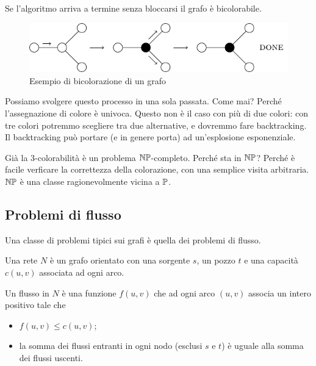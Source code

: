 Se l'algoritmo arriva a termine senza bloccarsi il grafo è bicolorabile.

\begin{figure}[h]
    \begin{center}
        \includegraphics{./img/complexity_intro/2Coloration.pdf}
    \end{center}
    \caption{Esempio di bicolorazione di un grafo}
\end{figure}

Possiamo svolgere questo processo in una sola passata. Come mai? Perché l'assegnazione di colore è
univoca. Questo non è il caso con più di due colori: con tre colori potremmo scegliere tra due
alternative, e dovremmo fare backtracking. Il backtracking può portare (e in genere porta) ad
un'esplosione esponenziale.

Già la 3-colorabilità è un problema $\mathbb{NP}$-completo. Perché sta in $\mathbb{NP}$? Perché è
facile verficare la correttezza della colorazione, con una semplice visita arbitraria. $\mathbb{NP}$ è
una classe ragionevolmente vicina a $\mathbb{P}$.

\subsection{Problemi di flusso}

Una classe di problemi tipici sui grafi è quella dei problemi di flusso.

\begin{defn}
    Una rete $N$ è un grafo orientato con una sorgente $s$, un pozzo $t$ e una capacità $c(u,v)$
    associata ad ogni arco.
\end{defn}

\begin{defn}
    Un flusso in $N$ è una funzione $f(u,v)$ che ad ogni arco $(u,v)$ associa un intero positivo
    tale che
    \begin{itemize}
        \item $f(u,v) \leq c(u,v)$;
        \item la somma dei flussi entranti in ogni nodo (esclusi $s$ e $t$) è uguale alla
        somma dei flussi uscenti.
    \end{itemize}
\end{defn}

